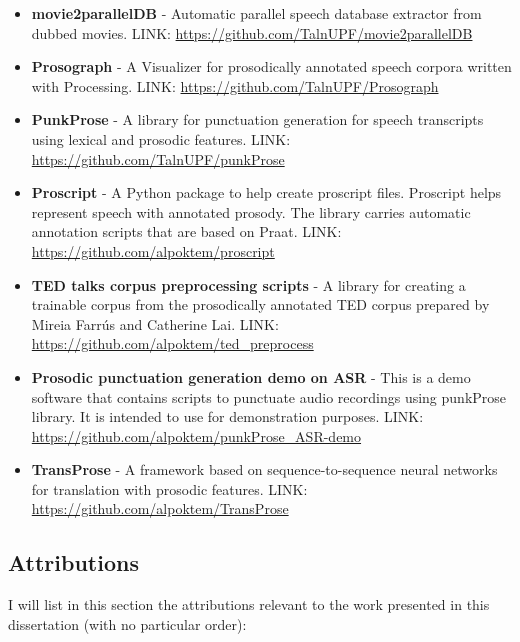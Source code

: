 \begin{itemize}
    \item \textbf{movie2parallelDB} - Automatic parallel speech database extractor from dubbed movies. LINK: \url{https://github.com/TalnUPF/movie2parallelDB}
    \item \textbf{Prosograph} - A Visualizer for prosodically annotated speech corpora written with Processing. LINK: \url{https://github.com/TalnUPF/Prosograph}
    \item \textbf{PunkProse} - A library for punctuation generation for speech transcripts using lexical and prosodic features. LINK: \url{https://github.com/TalnUPF/punkProse}
    \item \textbf{Proscript} - A Python package to help create proscript files. Proscript helps represent speech with annotated prosody. The library carries automatic annotation scripts that are based on Praat. LINK: \url{https://github.com/alpoktem/proscript}
    \item \textbf{TED talks corpus preprocessing scripts} - A library for creating a trainable corpus from the prosodically annotated TED corpus prepared by Mireia Farrús and Catherine Lai. LINK: \url{https://github.com/alpoktem/ted_preprocess}
    \item \textbf{Prosodic punctuation generation demo on ASR} - This is a demo software that contains scripts to punctuate audio recordings using punkProse library. It is intended to use for demonstration purposes. LINK: \url{https://github.com/alpoktem/punkProse_ASR-demo}
    \item \textbf{TransProse} - A framework based on sequence-to-sequence neural networks for translation with prosodic features. LINK: \url{https://github.com/alpoktem/TransProse}
\end{itemize}


\subsection{Attributions}

I will list in this section the attributions relevant to the work presented in this dissertation (with no particular order):

